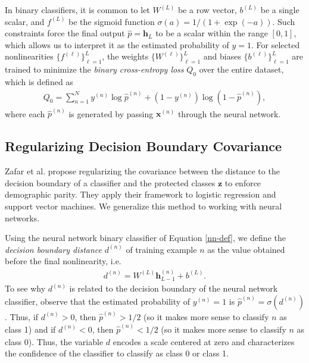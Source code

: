\documentclass{article}
\newcommand{\bd}[1]{\boldsymbol{#1}}
\newcommand{\hp}{\hat{p}}
\newcommand{\idx}[3][]{{#2}^{(#3)}_{#1}}
\newcommand{\bidx}[3][]{\bd{#2}^{(#3)}_{#1}}
\begin{document}
In binary classifiers, it is common to let $\idx W L$ be a row vector, $\idx b L$ be a single scalar, and $\idx f L$  be the sigmoid function $\sigma(a) = 1 / (1 + \exp (- a))$.  Such constraints force the final output $\hat{p} = \bd h_L$ to be a scalar within the range $[0, 1]$, which allows us to interpret it as the estimated probability of $y = 1$.  For selected nonlinearities $\{\idx f \ell\}_{\ell=1}^L$, the weights $\{\idx W \ell\}_{\ell=1}^L$ and biases $\{\idx b \ell\}_{\ell=1}^L$ are trained to minimize the \emph{binary cross-entropy loss} $Q_0$ over the entire dataset, which is defined as
\begin{align}
Q_0 = \sum_{n=1}^N \idx y n \log \idx \hp n + (1 - \idx y n) \log (1 - \idx \hp n), \label{bce}
\end{align}         
where each $\idx \hp n$ is generated by passing $\bidx x n$ through the neural network.

\subsection{Regularizing Decision Boundary Covariance} \label{method1}
Zafar et al.  propose regularizing the covariance between the distance to the decision boundary of a classifier and the protected classes $\bd z$ to enforce demographic parity.  They apply their framework to logistic regression and support vector machines.  We generalize this method to working with neural networks.

Using the neural network binary classifier of Equation \ref{nn-def}, we define the \emph{decision boundary distance} $\idx d n$ of training example $n$ as the value obtained before the final nonlinearity, i.e. 
\begin{align}
\idx d n = \idx W {L} \bidx[L-1] h n + \idx b {L}.
\end{align} 
To see why $\idx d n$ is related to the decision boundary of the neural network classifier, observe that the estimated probability of $\idx y n = 1$ is $\idx \hp n = \sigma(\idx d n)$.  Thus, if $\idx d n > 0$, then $\idx \hp n > 1/2$ (so it makes more sense to classify $n$ as class 1) and if $\idx d n < 0$, then $\idx \hp n < 1/2$ (so it makes more sense to classify $n$ as class 0).  Thus, the variable $d$ encodes a scale centered at zero and characterizes the confidence of the classifier to classify as class 0 or class 1.  
\end{document}

